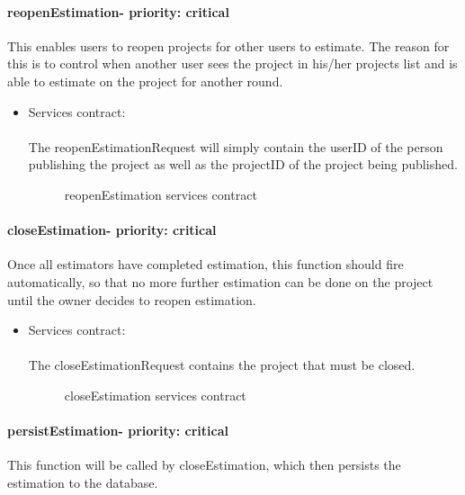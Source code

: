 	\paragraph{reopenEstimation- priority: critical}
	This enables users to reopen projects for other users to estimate. The reason for this is to control when another user sees the project in his/her projects list and is able to estimate on the project for another round.

	\begin{itemize}
		\item Services contract:\\ \\
		The reopenEstimationRequest will simply contain the userID of the person publishing the project as well as the projectID of the project being published.
		
		\begin{figure}[H]
	    	\centering
	    	\caption{reopenEstimation services contract}
	    	\label{fig:publishProject}
	   	\end{figure}
	\end{itemize}

	\paragraph{closeEstimation- priority: critical}
	Once all estimators have completed estimation, this function should fire automatically, so that no more further estimation can be done on the project until the owner decides to reopen estimation.

	\begin{itemize}
		\item Services contract:\\ \\
		The closeEstimationRequest contains the project that must be closed.
		\begin{figure}[H]
	    	\centering
	    	\caption{closeEstimation services contract}
	    	\label{fig:closeEstimationServicesContract}
	   	\end{figure}

	\end{itemize}

	\paragraph{persistEstimation- priority: critical}
	This function will be called by closeEstimation, which then persists the estimation to the database.

